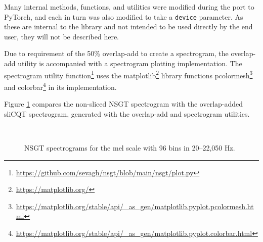 \documentclass[report.tex]{subfiles}
\begin{document}
Many internal methods, functions, and utilities were modified during the port to PyTorch, and each in turn was also modified to take a \Verb#device# parameter. As these are internal to the library and not intended to be used directly by the end user, they will not be described here.

Due to requirement of the 50\% overlap-add to create a spectrogram, the overlap-add utility is accompanied with a spectrogram plotting implementation. The spectrogram utility function\footnote{\url{https://github.com/sevagh/nsgt/blob/main/nsgt/plot.py}} uses the matplotlib\footnote{\url{https://matplotlib.org/}} library functions pcolormesh\footnote{\url{https://matplotlib.org/stable/api/_as_gen/matplotlib.pyplot.pcolormesh.html}} and colorbar\footnote{\url{https://matplotlib.org/stable/api/_as_gen/matplotlib.pyplot.colorbar.html}} in its implementation.

Figure \ref{fig:overlappedspectrograms} compares the non-sliced NSGT spectrogram with the overlap-added sliCQT spectrogram, generated with the overlap-add and spectrogram utilities.

\begin{figure}[ht]
	\centering
	\\
	\caption{NSGT spectrograms for the mel scale with 96 bins in 20--22,050 Hz.}
	\label{fig:overlappedspectrograms}
\end{figure}
\end{document}
